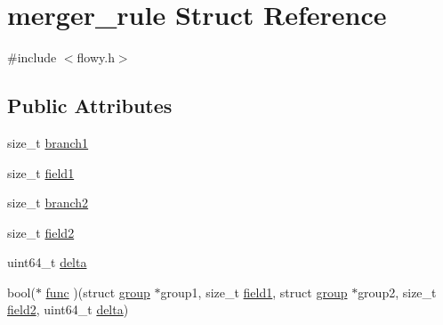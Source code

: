 \hypertarget{structmerger__rule}{\section{merger\-\_\-rule \-Struct \-Reference}
\label{structmerger__rule}
}


{\ttfamily \#include $<$flowy.\-h$>$}

\subsection*{\-Public \-Attributes}
\begin{DoxyCompactItemize}
\item 
size\-\_\-t \hyperlink{structmerger__rule_a7ec6995cf6218808af955a106bb5473e}{branch1}
\item 
size\-\_\-t \hyperlink{structmerger__rule_a75ff8ca454374332c6b08bb8eb281f87}{field1}
\item 
size\-\_\-t \hyperlink{structmerger__rule_a6e9234ee65879ba2d503ea13762f737f}{branch2}
\item 
size\-\_\-t \hyperlink{structmerger__rule_aa3485e9c1ea5728822474c3128d8c650}{field2}
\item 
uint64\-\_\-t \hyperlink{structmerger__rule_aa8b91c31aed9947f7f462eefd798288e}{delta}
\item 
bool($\ast$ \hyperlink{structmerger__rule_ac607a34fb5aec5b1ac28961b4148c0e0}{func} )(struct \hyperlink{structgroup}{group} $\ast$group1, size\-\_\-t \hyperlink{structmerger__rule_a75ff8ca454374332c6b08bb8eb281f87}{field1}, struct \hyperlink{structgroup}{group} $\ast$group2, size\-\_\-t \hyperlink{structmerger__rule_aa3485e9c1ea5728822474c3128d8c650}{field2}, uint64\-\_\-t \hyperlink{structmerger__rule_aa8b91c31aed9947f7f462eefd798288e}{delta})
\end{DoxyCompactItemize}


